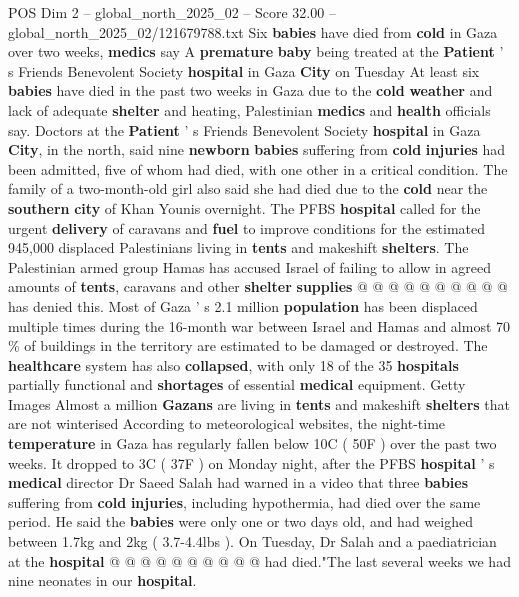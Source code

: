 \begin{textsample}{POS Dim 2 – global\_north\_2025\_02 – Score 32.00 – global\_north\_2025\_02/121679788.txt}  \label{ex:f2_pos_431}
Six \textbf{babies} have died from \textbf{cold} in Gaza over two weeks, \textbf{medics} say A \textbf{premature} \textbf{baby} being treated at the \textbf{Patient} ' s Friends Benevolent Society \textbf{hospital} in Gaza \textbf{City} on Tuesday At least six \textbf{babies} have died in the past two weeks in Gaza due to the \textbf{cold} \textbf{weather} and lack of adequate \textbf{shelter} and heating, Palestinian \textbf{medics} and \textbf{health} officials say.
Doctors at the \textbf{Patient} ' s Friends Benevolent Society \textbf{hospital} in Gaza \textbf{City}, in the north, said nine \textbf{newborn} \textbf{babies} suffering from \textbf{cold} \textbf{injuries} had been admitted, five of whom had died, with one other in a critical condition.
The family of a two-month-old girl also said she had died due to the \textbf{cold} near the \textbf{southern} \textbf{city} of Khan Younis overnight.
The PFBS \textbf{hospital} called for the urgent \textbf{delivery} of caravans and \textbf{fuel} to improve conditions for the estimated 945,000 displaced Palestinians living in \textbf{tents} and makeshift \textbf{shelters}.
The Palestinian armed group Hamas has accused Israel of failing to allow in agreed amounts of \textbf{tents}, caravans and other \textbf{shelter} \textbf{supplies} @ @ @ @ @ @ @ @ @ @ has denied this.
Most of Gaza ' s 2.1 million \textbf{population} has been displaced multiple times during the 16-month war between Israel and Hamas and almost 70 \% of buildings in the territory are estimated to be damaged or destroyed.
The \textbf{healthcare} system has also \textbf{collapsed}, with only 18 of the 35 \textbf{hospitals} partially functional and \textbf{shortages} of essential \textbf{medical} equipment.
Getty Images Almost a million \textbf{Gazans} are living in \textbf{tents} and makeshift \textbf{shelters} that are not winterised According to meteorological websites, the night-time \textbf{temperature} in Gaza has regularly fallen below 10C ( 50F ) over the past two weeks.
It dropped to 3C ( 37F ) on Monday night, after the PFBS \textbf{hospital} ' s \textbf{medical} director Dr Saeed Salah had warned in a video that three \textbf{babies} suffering from \textbf{cold} \textbf{injuries}, including hypothermia, had died over the same period.
He said the \textbf{babies} were only one or two days old, and had weighed between 1.7kg and 2kg ( 3.7-4.4lbs ).
On Tuesday, Dr Salah and a paediatrician at the \textbf{hospital} @ @ @ @ @ @ @ @ @ @ had died."The last several weeks we had nine neonates in our \textbf{hospital}.

\end{textsample}
